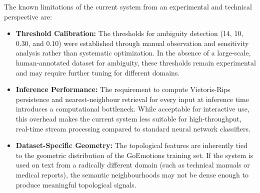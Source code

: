 The known limitations of the current system from an experimental and technical perspective are:

\begin{itemize}
    \item \textbf{Threshold Calibration:} The thresholds for ambiguity detection (14, 10, 0.30,
    and 0.10) were established through manual observation and sensitivity analysis rather than
    systematic optimization. In the absence of a large-scale, human-annotated dataset for
    ambiguity, these thresholds remain experimental and may require further tuning for different
    domains.

    \item \textbf{Inference Performance:} The requirement to compute Vietoris-Rips persistence and
    nearest-neighbour retrieval for every input at inference time introduces a computational
    bottleneck. While acceptable for interactive use, this overhead makes the current system
    less suitable for high-throughput, real-time stream processing compared to standard
    neural network classifiers.

    \item \textbf{Dataset-Specific Geometry:} The topological features are inherently tied to the
    geometric distribution of the GoEmotions training set. If the system is used on text from a
    radically different domain (such as technical manuals or medical reports), the semantic
    neighbourhoods may not be dense enough to produce meaningful topological signals.
\end{itemize}

